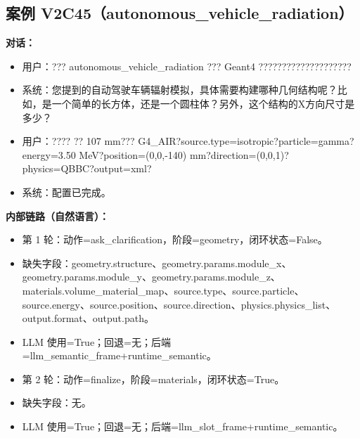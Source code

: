 \documentclass[11pt]{ctexart}
\begin{document}
\subsection{案例 V2C45（autonomous\_vehicle\_radiation）}
\textbf{对话：}
\begin{itemize}
\item 用户：??? autonomous\_vehicle\_radiation ??? Geant4 ????????????????????
\item 系统：您提到的自动驾驶车辆辐射模拟，具体需要构建哪种几何结构呢？比如，是一个简单的长方体，还是一个圆柱体？另外，这个结构的X方向尺寸是多少？
\item 用户：???? ?? 107 mm??? G4\_AIR?source.type=isotropic?particle=gamma?energy=3.50 MeV?position=(0,0,-140) mm?direction=(0,0,1)?physics=QBBC?output=xml?
\item 系统：配置已完成。
\end{itemize}
\textbf{内部链路（自然语言）：}
\begin{itemize}
\item 第 1 轮：动作=ask\_clarification，阶段=geometry，闭环状态=False。
\item 缺失字段：geometry.structure、geometry.params.module\_x、geometry.params.module\_y、geometry.params.module\_z、materials.volume\_material\_map、source.type、source.particle、source.energy、source.position、source.direction、physics.physics\_list、output.format、output.path。
\item LLM 使用=True；回退=无；后端=llm\_semantic\_frame+runtime\_semantic。
\item 第 2 轮：动作=finalize，阶段=materials，闭环状态=True。
\item 缺失字段：无。
\item LLM 使用=True；回退=无；后端=llm\_slot\_frame+runtime\_semantic。
\end{itemize}
\end{document}
